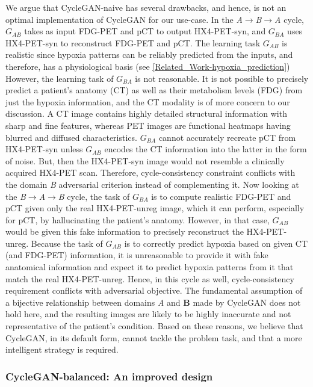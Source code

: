 We argue that CycleGAN-naive has several drawbacks, and hence, is not an optimal implementation of CycleGAN for our use-case. In the \textit{A}$\rightarrow$\textit{B}$\rightarrow$\textit{A} cycle, $G_{AB}$ takes as input FDG-PET and pCT to output HX4-PET-syn, and $G_{BA}$ uses HX4-PET-syn to reconstruct FDG-PET and pCT. The learning task $G_{AB}$ is realistic since hypoxia patterns can be reliably predicted from the inputs, and therefore, has a physiological basis (see \ref{Related_Work-hypoxia_prediction}) However, the learning task of $G_{BA}$ is not reasonable. It is not possible to precisely predict a patient's anatomy (CT) as well as their metabolism levels (FDG) from just the hypoxia information, and the CT modality is of more concern to our discussion. A CT image contains highly detailed structural information with sharp and fine features, whereas PET images are functional heatmaps having blurred and diffused characteristics. $G_{BA}$ cannot accurately recreate pCT from HX4-PET-syn unless $G_{AB}$ encodes the CT information into the latter in the form of noise. But, then the HX4-PET-syn image would not resemble a clinically acquired HX4-PET scan. Therefore, cycle-consistency constraint conflicts with the domain \textit{B} adversarial criterion instead of complementing it. Now looking at the \textit{B}$\rightarrow$\textit{A}$\rightarrow$\textit{B} cycle, the task of $G_{BA}$ is to compute realistic FDG-PET and pCT given only the real HX4-PET-unreg image, which it can perform, especially for pCT, by hallucinating the patient's anatomy. However, in that case, $G_{AB}$ would be given this fake information to precisely reconstruct the HX4-PET-unreg. Because the task of $G_{AB}$ is to correctly predict hypoxia based on given CT (and FDG-PET) information, it is unreasonable to provide it with fake anatomical information and expect it to predict hypoxia patterns from it that match the real HX4-PET-unreg. Hence, in this cycle as well, cycle-consistency requirement conflicts with adversarial objective. The fundamental assumption of a bijective relationship between domains \textit{A} and \textbf{B} made by CycleGAN does not hold here, and the resulting images are likely to be highly inaccurate and not representative of the patient's condition. Based on these reasons, we believe that CycleGAN, in its default form, cannot tackle the problem task, and that a more intelligent strategy is required.


\subsubsection{CycleGAN-balanced: An improved design}


